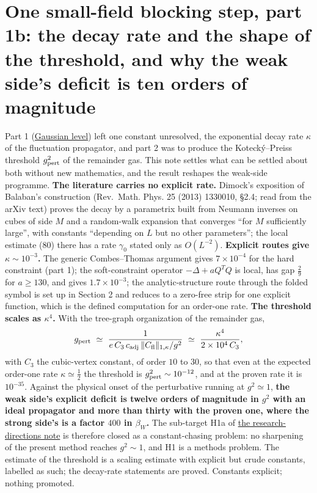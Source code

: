 \documentclass[11pt,a4paper]{article}
\begin{document}
\hypertarget{one-small-field-blocking-step-part-1b-the-decay-rate-and-the-shape-of-the-threshold-and-why-the-weak-sides-deficit-is-ten-orders-of-magnitude}{%
\section{One small-field blocking step, part 1b: the decay rate and the
shape of the threshold, and why the weak side's deficit is ten orders of
magnitude}\label{one-small-field-blocking-step-part-1b-the-decay-rate-and-the-shape-of-the-threshold-and-why-the-weak-sides-deficit-is-ten-orders-of-magnitude}}

Part 1 (\href{small-field-step-gaussian.md}{Gaussian level}) left one
constant unresolved, the exponential decay rate \(\kappa\) of the
fluctuation propagator, and part 2 was to produce the Kotecký--Preiss
threshold \(g_{\rm pert}^2\) of the remainder gas. This note settles
what can be settled about both without new mathematics, and the result
reshapes the weak-side programme. \textbf{The literature carries no
explicit rate.} Dimock's exposition of Balaban's construction
(Rev.~Math. Phys. 25 (2013) 1330010, §2.4; read from the arXiv text)
proves the decay by a parametrix built from Neumann inverses on cubes of
side \(M\) and a random-walk expansion that converges ``for \(M\)
sufficiently large'', with constants ``depending on \(L\) but no other
parameters''; the local estimate (80) there has a rate \(\gamma_0\)
stated only as \(O(L^{-2})\). \textbf{Explicit routes give
\(\kappa\sim10^{-3}\).} The generic Combes--Thomas argument gives
\(7\times10^{-4}\) for the hard constraint (part 1); the soft-constraint
operator \(-\Delta+aQ^TQ\) is local, has gap \(\tfrac29\) for
\(a\ge130\), and gives \(1.7\times10^{-3}\); the analytic-structure
route through the folded symbol is set up in Section 2 and reduces to a
zero-free strip for one explicit function, which is the defined
computation for an order-one rate. \textbf{The threshold scales as
\(\kappa^4\).} With the tree-graph organization of the remainder gas,
\[g_{\rm pert}\ \simeq\ \frac{1}{e\,C_3\,c_{\rm adj}\,\|C_{\rm fl}\|_{1,\kappa}/g^2}
\ \simeq\ \frac{\kappa^4}{2\times10^{4}\,C_3},\] with \(C_3\) the
cubic-vertex constant, of order \(10\) to \(30\), so that even at the
expected order-one rate \(\kappa\simeq\tfrac12\) the threshold is
\(g_{\rm pert}^2\sim10^{-12}\), and at the proven rate it is
\(10^{-35}\). Against the physical onset of the perturbative running at
\(g^2\simeq1\), \textbf{the weak side's explicit deficit is twelve
orders of magnitude in \(g^2\) with an ideal propagator and more than
thirty with the proven one, where the strong side's is a factor \(400\)
in \(\beta_W\).} The sub-target H1a of
\href{reasons-to-stop-as-research.md}{the research-directions note} is
therefore closed as a constant-chasing problem: no sharpening of the
present method reaches \(g^2\sim1\), and H1 is a methods problem. The
estimate of the threshold is a scaling estimate with explicit but crude
constants, labelled as such; the decay-rate statements are proved.
Constants explicit; nothing promoted.
\end{document}
